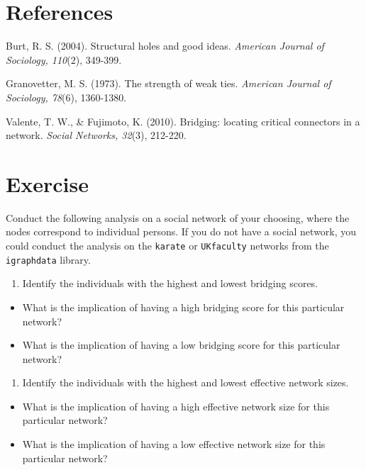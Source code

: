 \documentclass[
]{book}
\providecommand{\tightlist}{%
  \setlength{\itemsep}{0pt}\setlength{\parskip}{0pt}}
\begin{document}
\section{References}\label{references-2}

Burt, R. S. (2004). Structural holes and good ideas. \emph{American Journal of Sociology, 110}(2), 349-399.

Granovetter, M. S. (1973). The strength of weak ties. \emph{American Journal of Sociology, 78}(6), 1360-1380.

Valente, T. W., \& Fujimoto, K. (2010). Bridging: locating critical connectors in a network. \emph{Social Networks, 32}(3), 212-220.

\section{Exercise}\label{exercise-11}

Conduct the following analysis on a social network of your choosing, where the nodes correspond to individual persons. If you do not have a social network, you could conduct the analysis on the \texttt{karate} or \texttt{UKfaculty} networks from the \texttt{igraphdata} library.

\begin{enumerate}
\def\labelenumi{\arabic{enumi}.}
\tightlist
\item
  Identify the individuals with the highest and lowest bridging scores.
\end{enumerate}

\begin{itemize}
\tightlist
\item
  What is the implication of having a high bridging score for this particular network?
\item
  What is the implication of having a low bridging score for this particular network?
\end{itemize}

\begin{enumerate}
\def\labelenumi{\arabic{enumi}.}
\setcounter{enumi}{1}
\tightlist
\item
  Identify the individuals with the highest and lowest effective network sizes.
\end{enumerate}

\begin{itemize}
\tightlist
\item
  What is the implication of having a high effective network size for this particular network?
\item
  What is the implication of having a low effective network size for this particular network?
\end{itemize}
\end{document}
